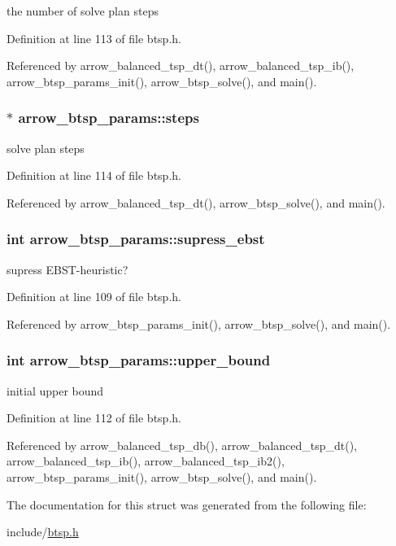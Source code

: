 the number of solve plan steps 

Definition at line 113 of file btsp.h.

Referenced by arrow\_\-balanced\_\-tsp\_\-dt(), arrow\_\-balanced\_\-tsp\_\-ib(), arrow\_\-btsp\_\-params\_\-init(), arrow\_\-btsp\_\-solve(), and main().\hypertarget{structarrow__btsp__params_49aedb95b2fc4a725e3bb8485470484b}{
\subsubsection[{steps}]{$\ast$ {\bf arrow\_\-btsp\_\-params::steps}}}
\label{structarrow__btsp__params_49aedb95b2fc4a725e3bb8485470484b}


solve plan steps 

Definition at line 114 of file btsp.h.

Referenced by arrow\_\-balanced\_\-tsp\_\-dt(), arrow\_\-btsp\_\-solve(), and main().\hypertarget{structarrow__btsp__params_cd85b850ac7c8495a4689100e8c3182c}{
\subsubsection[{supress\_\-ebst}]{\setlength{\rightskip}{0pt plus 5cm}int {\bf arrow\_\-btsp\_\-params::supress\_\-ebst}}}
\label{structarrow__btsp__params_cd85b850ac7c8495a4689100e8c3182c}


supress EBST-heuristic? 

Definition at line 109 of file btsp.h.

Referenced by arrow\_\-btsp\_\-params\_\-init(), arrow\_\-btsp\_\-solve(), and main().\hypertarget{structarrow__btsp__params_b8749004215015a78139b8e4e1fb8905}{
\subsubsection[{upper\_\-bound}]{\setlength{\rightskip}{0pt plus 5cm}int {\bf arrow\_\-btsp\_\-params::upper\_\-bound}}}
\label{structarrow__btsp__params_b8749004215015a78139b8e4e1fb8905}


initial upper bound 

Definition at line 112 of file btsp.h.

Referenced by arrow\_\-balanced\_\-tsp\_\-db(), arrow\_\-balanced\_\-tsp\_\-dt(), arrow\_\-balanced\_\-tsp\_\-ib(), arrow\_\-balanced\_\-tsp\_\-ib2(), arrow\_\-btsp\_\-params\_\-init(), arrow\_\-btsp\_\-solve(), and main().

The documentation for this struct was generated from the following file:\begin{CompactItemize}
\item 
include/\hyperlink{btsp_8h}{btsp.h}\end{CompactItemize}

